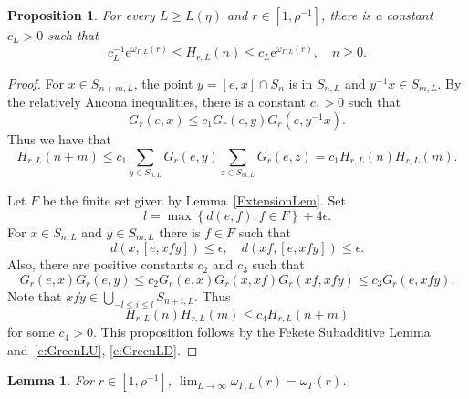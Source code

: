 \documentclass{amsart}
\newtheorem{prop}[thm]{Proposition}
\newtheorem{lem}[thm]{Lemma}
\theoremstyle{definition}
\theoremstyle{remark}
\begin{document}
\begin{prop}\label{puregrowthtransitional}
  \label{GreenL}
  For every $L \geq L(\eta)$ and $r \in [1, \rho^{-1}]$, there is a constant $c_L > 0$ such that
  \[
    c_L^{-1} \mathrm{e}^{\omega_{\Gamma, L}(r)} \leq H_{r, L}(n) \leq c_L \mathrm{e}^{\omega_{\Gamma, L}(r)}, \quad n \geq 0. 
  \]
  
\end{prop}

\begin{proof}
  For $x \in S_{n + m, L}$, the point $y = [e, x] \cap S_n$ is in $S_{n, L}$ and $y^{-1}x \in S_{m, L}$.  By the relatively Ancona inequalities, there is a constant $c_1 > 0$ such that
\[
  G_r(e, x) \leq c_1 G_r(e, y) G_r(e, y^{-1} x).
\]
Thus we have that
\begin{equation}
  \label{e:GreenLU}
  H_{r, L}(n + m) \leq c_1 \sum_{y \in S_{n, L}} G_r(e, y) \sum_{z \in S_{m, L}} G_r(e, z) = c_1 H_{r, L}(n) H_{r, L}(m). 
\end{equation}


Let $F$ be the finite set given by Lemma~\ref{ExtensionLem}.  Set
\[
  l = \max \left\{ d(e, f) \colon f \in F \right\} + 4 \epsilon. 
\]
For $x \in S_{n, L}$ and $y \in S_{m, L}$ there is $f \in F$ such that
\[
  d(x, [e, x f y]) \leq \epsilon, \quad d(x f, [e, x f y]) \leq \epsilon. 
\]
Also, there are positive constants $c_2$ and $c_3$ such that
\[
  G_r(e, x) G_r(e, y) \leq c_2 G_r(e, x) G_r(x, x f) G_r(x f, x f y) \leq c_3 G_r(e, x f y).  
\]
Note that $x f y \in \bigcup_{-l \leq i \leq l} S_{n + i, L}$.  Thus
\begin{equation}
  \label{e:GreenLD}
  H_{r, L}(n) H_{r, L}(m) \leq c_4 H_{r, L}(n+m)
\end{equation}
for some $c_4 > 0$.  This proposition follows by the Fekete Subadditive Lemma and~\eqref{e:GreenLU}, \eqref{e:GreenLD}. 
\end{proof}


\begin{lem}\label{omegaL}
  For $r \in [1, \rho^{-1}]$, $\lim_{L \to \infty} \omega_{\Gamma, L}(r) = \omega_{\Gamma}(r)$. 
\end{lem}
\end{document}
